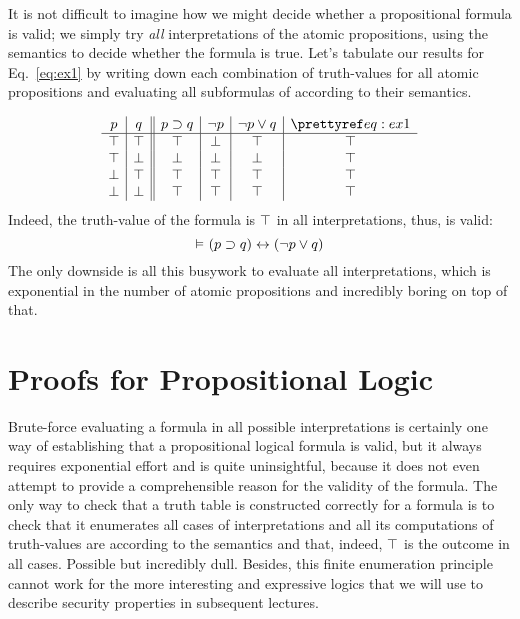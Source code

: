\documentclass[11pt,twoside]{scrartcl}
\begin{document}
It is not difficult to imagine how we might decide whether a propositional formula is valid; we simply try \emph{all} interpretations of the atomic propositions, using the semantics to decide whether the formula is true. 
Let's tabulate our results for Eq.~\ref{eq:ex1} by writing down each combination of truth-values for all atomic propositions and evaluating all subformulas of  according to their semantics.

\[\begin{array}{c|c||c|c|c|c}
p & q & p \limply q & \lnot p & \lnot p \lor q & \rref{eq:ex1}
    \\\hline
    \mtrue & \mtrue & \mtrue & \mfalse & \mtrue & \mtrue \\
    \mtrue & \mfalse & \mfalse & \mfalse & \mfalse & \mtrue \\
    \mfalse & \mtrue & \mtrue & \mtrue & \mtrue & \mtrue \\
    \mfalse & \mfalse & \mtrue & \mtrue & \mtrue & \mtrue
\end{array}\]
Indeed, the truth-value of the formula  is $\top$ in all interpretations, thus,  is valid:
\[
\entails (p \limply q) \lbisubjunct (\lnot p \lor q)
\]
The only downside is all this busywork to evaluate all interpretations, which is exponential in the number of atomic propositions and incredibly boring on top of that.


\section{Proofs for Propositional Logic}

Brute-force evaluating a formula in all possible interpretations is certainly one way of establishing that a propositional logical formula is valid, but it always requires exponential effort and is quite uninsightful, because it does not even attempt to provide a comprehensible reason for the validity of the formula.
The only way to check that a truth table is constructed correctly for a formula is to check that it enumerates all cases of interpretations and all its computations of truth-values are according to the semantics and that, indeed, $\top$ is the outcome in all cases.
Possible but incredibly dull.
Besides, this finite enumeration principle cannot work for the more interesting and expressive logics that we will use to describe security properties in subsequent lectures.
\end{document}
